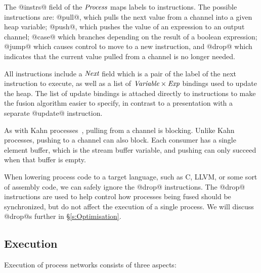 The @instrs@ field of the $\textit{Process}$ maps labels to instructions. The possible instructions are: @pull@, which pulls the next value from a channel into a given heap variable; @push@, which pushes the value of an expression to an output channel; @case@ which branches depending on the result of a boolean expression; @jump@ which causes control to move to a new instruction, and @drop@ which indicates that the current value pulled from a channel is no longer needed. 

All instructions include a $\textit{Next}$ field which is a pair of the label of the next instruction to execute, as well as a list of $\textit{Variable} \times \textit{Exp}$ bindings used to update the heap. The list of update bindings is attached directly to instructions to make the fusion algorithm easier to specify, in contrast to a presentation with a separate @update@ instruction. 

As with Kahn processes~\cite{kahn1976coroutines}, pulling from a channel is blocking. Unlike Kahn processes, pushing to a channel can also block. Each consumer has a single element buffer, which is the stream buffer variable, and pushing can only succeed when that buffer is empty.

When lowering process code to a target language, such as C, LLVM, or some sort of assembly code, we can safely ignore the @drop@ instructions. The @drop@ instructions are used to help control how processes being fused should be synchronized, but do not affect the execution of a single process. We will discuss @drop@s further in \S\ref{s:Optimisation}.


\subsection{Execution}
\label{s:Process:Eval}




Execution of process networks consists of three aspects:


